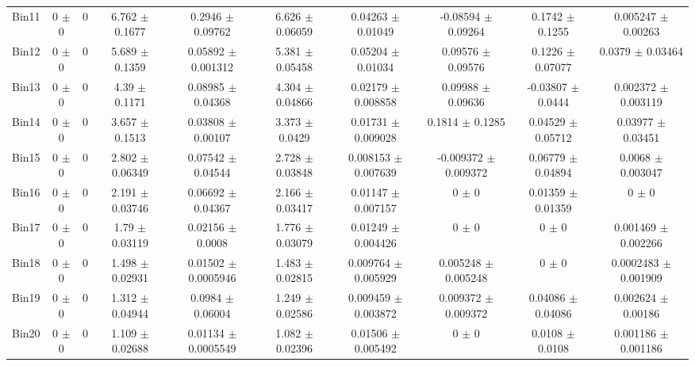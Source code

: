 \begin{tabular}{@{\extracolsep{4pt}}lccccccccc@{}}
     Bin11 & 0 $\pm$ 0 & 0 & 6.762 $\pm$ 0.1677 & 0.2946 $\pm$ 0.09762 & 6.626 $\pm$ 0.06059 & 0.04263 $\pm$ 0.01049 & -0.08594 $\pm$ 0.09264 & 0.1742 $\pm$ 0.1255 & 0.005247 $\pm$ 0.00263 \\ 
     Bin12 & 0 $\pm$ 0 & 0 & 5.689 $\pm$ 0.1359 & 0.05892 $\pm$ 0.001312 & 5.381 $\pm$ 0.05458 & 0.05204 $\pm$ 0.01034 & 0.09576 $\pm$ 0.09576 & 0.1226 $\pm$ 0.07077 & 0.0379 $\pm$ 0.03464 \\ 
     Bin13 & 0 $\pm$ 0 & 0 & 4.39 $\pm$ 0.1171 & 0.08985 $\pm$ 0.04368 & 4.304 $\pm$ 0.04866 & 0.02179 $\pm$ 0.008858 & 0.09988 $\pm$ 0.09636 & -0.03807 $\pm$ 0.0444 & 0.002372 $\pm$ 0.003119 \\ 
     Bin14 & 0 $\pm$ 0 & 0 & 3.657 $\pm$ 0.1513 & 0.03808 $\pm$ 0.00107 & 3.373 $\pm$ 0.0429 & 0.01731 $\pm$ 0.009028 & 0.1814 $\pm$ 0.1285 & 0.04529 $\pm$ 0.05712 & 0.03977 $\pm$ 0.03451 \\ 
     Bin15 & 0 $\pm$ 0 & 0 & 2.802 $\pm$ 0.06349 & 0.07542 $\pm$ 0.04544 & 2.728 $\pm$ 0.03848 & 0.008153 $\pm$ 0.007639 & -0.009372 $\pm$ 0.009372 & 0.06779 $\pm$ 0.04894 & 0.0068 $\pm$ 0.003047 \\ 
     Bin16 & 0 $\pm$ 0 & 0 & 2.191 $\pm$ 0.03746 & 0.06692 $\pm$ 0.04367 & 2.166 $\pm$ 0.03417 & 0.01147 $\pm$ 0.007157 & 0 $\pm$ 0 & 0.01359 $\pm$ 0.01359 & 0 $\pm$ 0 \\ 
     Bin17 & 0 $\pm$ 0 & 0 & 1.79 $\pm$ 0.03119 & 0.02156 $\pm$ 0.0008 & 1.776 $\pm$ 0.03079 & 0.01249 $\pm$ 0.004426 & 0 $\pm$ 0 & 0 $\pm$ 0 & 0.001469 $\pm$ 0.002266 \\ 
     Bin18 & 0 $\pm$ 0 & 0 & 1.498 $\pm$ 0.02931 & 0.01502 $\pm$ 0.0005946 & 1.483 $\pm$ 0.02815 & 0.009764 $\pm$ 0.005929 & 0.005248 $\pm$ 0.005248 & 0 $\pm$ 0 & 0.0002483 $\pm$ 0.001909 \\ 
     Bin19 & 0 $\pm$ 0 & 0 & 1.312 $\pm$ 0.04944 & 0.0984 $\pm$ 0.06004 & 1.249 $\pm$ 0.02586 & 0.009459 $\pm$ 0.003872 & 0.009372 $\pm$ 0.009372 & 0.04086 $\pm$ 0.04086 & 0.002624 $\pm$ 0.00186 \\ 
     Bin20 & 0 $\pm$ 0 & 0 & 1.109 $\pm$ 0.02688 & 0.01134 $\pm$ 0.0005549 & 1.082 $\pm$ 0.02396 & 0.01506 $\pm$ 0.005492 & 0 $\pm$ 0 & 0.0108 $\pm$ 0.0108 & 0.001186 $\pm$ 0.001186 \\ 
\hline\hline
  \end{tabular}
